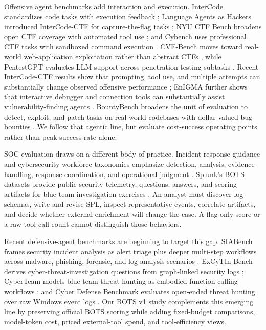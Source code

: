 \documentclass{jmlr}%
\begin{document}
Offensive agent benchmarks add interaction and execution.
InterCode standardizes code tasks with execution feedback \citep{yang2023intercode}; Language Agents as Hackers introduced InterCode-CTF for capture-the-flag tasks \citep{yang2023languagehackers}; NYU CTF Bench broadens open CTF coverage with automated tool use \citep{shao2024nyuctfbench}; and Cybench uses professional CTF tasks with sandboxed command execution \citep{zhang2024cybench}.
CVE-Bench moves toward real-world web-application exploitation rather than abstract CTFs \citep{zhu2025cvebench}, while PentestGPT evaluates LLM support across penetration-testing subtasks \citep{deng2024pentestgpt}.
Recent InterCode-CTF results show that prompting, tool use, and multiple attempts can substantially change observed offensive performance \citep{turtayev2024hackingctfs}; EnIGMA further shows that interactive debugger and connection tools can substantially assist vulnerability-finding agents \citep{abramovich2025enigma}.
BountyBench broadens the unit of evaluation to detect, exploit, and patch tasks on real-world codebases with dollar-valued bug bounties \citep{zhang2025bountybench}.
We follow that agentic line, but evaluate cost-success operating points rather than peak success rate alone.

SOC evaluation draws on a different body of practice.
Incident-response guidance and cybersecurity workforce taxonomies emphasize detection, analysis, evidence handling, response coordination, and operational judgment \citep{nist_sp800_61r3,nist_nice_800_181r1}.
Splunk's BOTS datasets provide public security telemetry, questions, answers, and scoring artifacts for blue-team investigation exercises \citep{splunk_botsv1,splunk_botsv2,splunk_botsv3}.
An analyst must discover log schemas, write and revise SPL, inspect representative events, correlate artifacts, and decide whether external enrichment will change the case.
A flag-only score or a raw tool-call count cannot distinguish those behaviors.

Recent defensive-agent benchmarks are beginning to target this gap.
SIABench frames security incident analysis as alert triage plus deeper multi-step workflows across malware, phishing, forensic, and log-analysis scenarios \citep{majumdar2026siabench}.
ExCyTIn-Bench derives cyber-threat-investigation questions from graph-linked security logs \citep{wu2025excytin}; CyberTeam models blue-team threat hunting as embodied function-calling workflows \citep{liu2025cyberteam}; and Cyber Defense Benchmark evaluates open-ended threat hunting over raw Windows event logs \citep{kumar2026cyberdefensebench}.
Our BOTS v1 study complements this emerging line by preserving official BOTS scoring while adding fixed-budget comparisons, model-token cost, priced external-tool spend, and tool-efficiency views.
\end{document}
